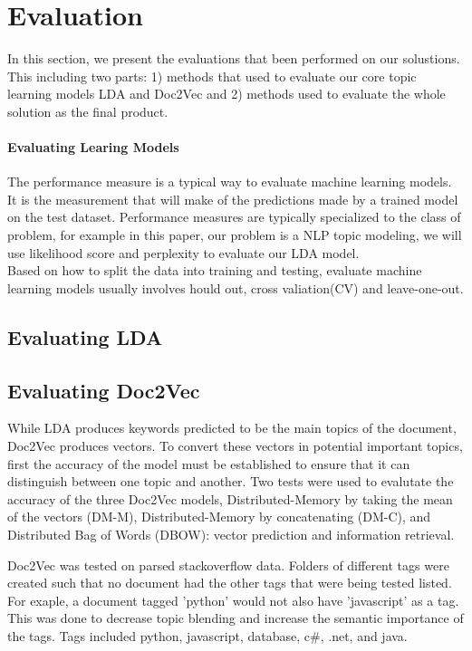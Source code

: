 
\section{Evaluation}
In this section, we present the evaluations that been performed on our solustions. This including two parts: 1) methods that used to evaluate our core topic learning models LDA and Doc2Vec and 2) methods used to evaluate the whole solution as the final product. 
\paragraph{Evaluating Learing Models}
The performance measure is a typical way to evaluate machine learning models. It is the measurement that will make of the predictions made by a trained model on the test dataset. Performance measures are typically specialized to the class of problem, for example in this paper, our problem is a NLP topic modeling, we will use likelihood score and perplexity to evaluate our LDA model.\\
Based on how to split the data into training and testing, evaluate machine learning models usually involves hould out, cross valiation(CV) and leave-one-out. 

\subsection{Evaluating LDA}


\subsection{Evaluating Doc2Vec}
While LDA produces keywords predicted to be the main topics of the document, Doc2Vec produces vectors. To convert these vectors in potential important topics, first the accuracy of the model must be established to ensure that it can distinguish between one topic and another. Two tests were used to evalutate the accuracy of the three Doc2Vec models, Distributed-Memory by taking the mean of the vectors (DM-M), Distributed-Memory by concatenating (DM-C), and Distributed Bag of Words (DBOW): vector prediction and information retrieval.

Doc2Vec was tested on parsed stackoverflow data. Folders of different tags were created such that no document had the other tags that were being tested listed. For exaple, a document tagged 'python' would not also have 'javascript' as a tag. This was done to decrease topic blending and increase the semantic importance of the tags. Tags included python, javascript, database, c\#, .net, and java. 

